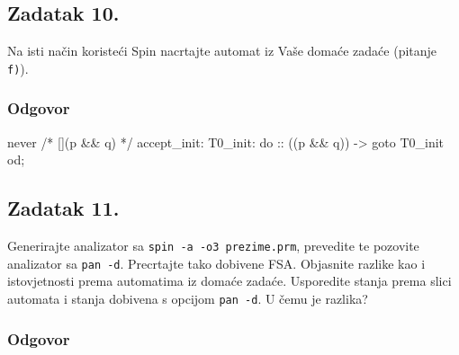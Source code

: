 \documentclass{article}
\newcommand{\zadatak}[1]{\subsection{Zadatak #1}}
\newcommand{\odgovor}{\subsubsection*{Odgovor}}
\begin{document}
\zadatak{10.}

Na isti način koristeći Spin nacrtajte automat iz Vaše domaće zadaće (pitanje \texttt{f)}).

\odgovor

\begin{ccode}
never  {    /* [](p && q) */
accept_init:
T0_init:
        do
        :: ((p && q)) -> goto T0_init
        od;
}
\end{ccode}

\begin{center}
\end{center}

\pagebreak


\zadatak{11.}

Generirajte analizator sa \texttt{spin -a -o3 prezime.prm}, prevedite te pozovite analizator sa \texttt{pan -d}. Precrtajte tako dobivene FSA. Objasnite razlike kao i istovjetnosti prema automatima iz domaće zadaće. Usporedite stanja prema slici automata i stanja dobivena s opcijom \texttt{pan -d}. U čemu je razlika?

\odgovor
\end{document}
